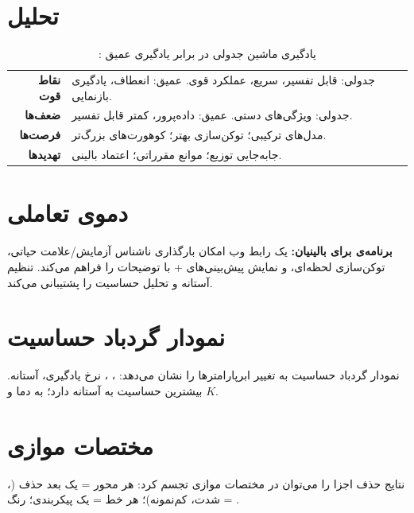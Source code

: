 \section{تحلیل }

\begin{table}[h]
\centering
\caption{: یادگیری ماشین جدولی در برابر یادگیری عمیق}
\begin{tabular}{rl}
\toprule
\textbf{نقاط قوت} & جدولی: قابل تفسیر، سریع، عملکرد قوی. عمیق: انعطاف، یادگیری بازنمایی. \\
\textbf{ضعف‌ها} & جدولی: ویژگی‌های دستی. عمیق: داده‌پرور، کمتر قابل تفسیر. \\
\textbf{فرصت‌ها} & مدل‌های ترکیبی؛ توکن‌سازی بهتر؛ کوهورت‌های بزرگ‌تر. \\
\textbf{تهدیدها} & جابه‌جایی توزیع؛ موانع مقرراتی؛ اعتماد بالینی. \\
\bottomrule
\end{tabular}
\label{tab:swot}
\end{table}

\section{دموی تعاملی}

\textbf{برنامه‌ی  برای بالینیان:} یک رابط وب امکان بارگذاری  ناشناس آزمایش/علامت حیاتی، توکن‌سازی لحظه‌ای، و نمایش پیش‌بینی‌های  +  با توضیحات  را فراهم می‌کند. تنظیم آستانه و تحلیل حساسیت را پشتیبانی می‌کند.

\section{نمودار گردباد حساسیت}

نمودار گردباد حساسیت  به تغییر ابرپارامترها را نشان می‌دهد: ، ، نرخ یادگیری، آستانه.  بیشترین حساسیت به آستانه دارد؛  به دما و $K$.

\section{مختصات موازی}

نتایج حذف اجزا را می‌توان در مختصات موازی تجسم کرد: هر محور = یک بعد حذف (، شدت، کم‌نمونه)؛ هر خط = یک پیکربندی؛ رنگ = .
